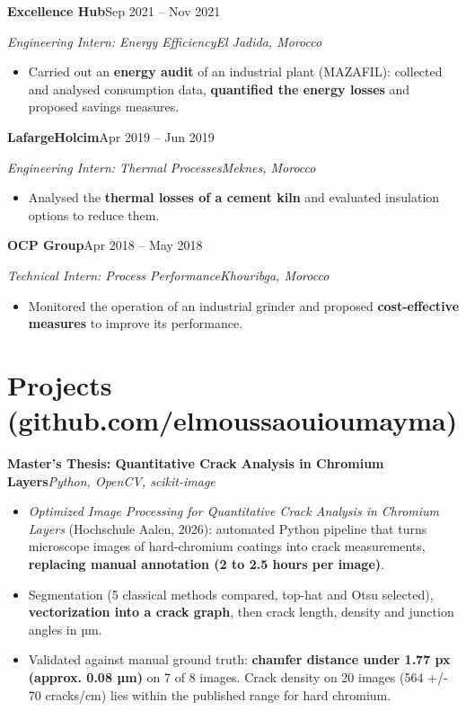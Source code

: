 \documentclass[10pt,a4paper]{article}
\newcommand{\org}[4]{%
  \par\vspace{4pt}\noindent\textbf{#1}\hfill #2\par
  \noindent\textit{#3}\hfill\textit{#4}\par}
\newcommand{\project}[2]{\par\vspace{4pt}\noindent\textbf{#1}\hfill\textit{#2}\par}
\begin{document}
\org{Excellence Hub}{Sep 2021 -- Nov 2021}{Engineering Intern: Energy Efficiency}{El Jadida, Morocco}
\begin{itemize}
  \item Carried out an \textbf{energy audit} of an industrial plant (MAZAFIL): collected and analysed consumption data, \textbf{quantified the energy losses} and proposed savings measures.
\end{itemize}

\org{LafargeHolcim}{Apr 2019 -- Jun 2019}{Engineering Intern: Thermal Processes}{Meknes, Morocco}
\begin{itemize}
  \item Analysed the \textbf{thermal losses of a cement kiln} and evaluated insulation options to reduce them.
\end{itemize}

\org{OCP Group}{Apr 2018 -- May 2018}{Technical Intern: Process Performance}{Khouribga, Morocco}
\begin{itemize}
  \item Monitored the operation of an industrial grinder and proposed \textbf{cost-effective measures} to improve its performance.
\end{itemize}

\section{Projects (github.com/elmoussaouioumayma)}
\project{Master's Thesis: Quantitative Crack Analysis in Chromium Layers}{Python, OpenCV, scikit-image}
\begin{itemize}
  \item \textit{Optimized Image Processing for Quantitative Crack Analysis in Chromium Layers} (Hochschule Aalen, 2026): automated Python pipeline that turns microscope images of hard-chromium coatings into crack measurements, \textbf{replacing manual annotation (2 to 2.5 hours per image)}.
  \item Segmentation (5 classical methods compared, top-hat and Otsu selected), \textbf{vectorization into a crack graph}, then crack length, density and junction angles in µm.
  \item Validated against manual ground truth: \textbf{chamfer distance under 1.77 px (approx. 0.08 µm)} on 7 of 8 images. Crack density on 20 images (564 +/- 70 cracks/cm) lies within the published range for hard chromium.
\end{itemize}
\end{document}
